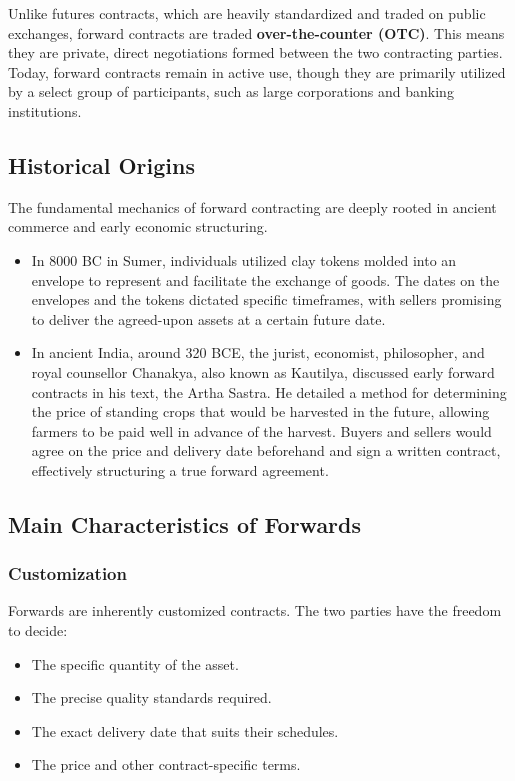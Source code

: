 \documentclass[12pt,openany]{book}
\begin{document}
Unlike futures contracts, which are heavily standardized and traded on public exchanges, forward contracts are traded \textbf{over-the-counter (OTC)}. This means they are private, direct negotiations formed between the two contracting parties. Today, forward contracts remain in active use, though they are primarily utilized by a select group of participants, such as large corporations and banking institutions.

\subsection{Historical Origins}

The fundamental mechanics of forward contracting are deeply rooted in ancient commerce and early economic structuring.

\begin{itemize}[leftmargin=*]
    \item In 8000 BC in Sumer, individuals utilized clay tokens molded into an envelope to represent and facilitate the exchange of goods. The dates on the envelopes and the tokens dictated specific timeframes, with sellers promising to deliver the agreed-upon assets at a certain future date.
    \item In ancient India, around 320 BCE, the jurist, economist, philosopher, and royal counsellor Chanakya, also known as Kautilya, discussed early forward contracts in his text, the Artha Sastra. He detailed a method for determining the price of standing crops that would be harvested in the future, allowing farmers to be paid well in advance of the harvest. Buyers and sellers would agree on the price and delivery date beforehand and sign a written contract, effectively structuring a true forward agreement.
\end{itemize}

\subsection{Main Characteristics of Forwards}

\subsubsection{Customization}

Forwards are inherently customized contracts. The two parties have the freedom to decide:

\begin{itemize}[leftmargin=*]
    \item The specific quantity of the asset.
    \item The precise quality standards required.
    \item The exact delivery date that suits their schedules.
    \item The price and other contract-specific terms.
\end{itemize}
\end{document}
